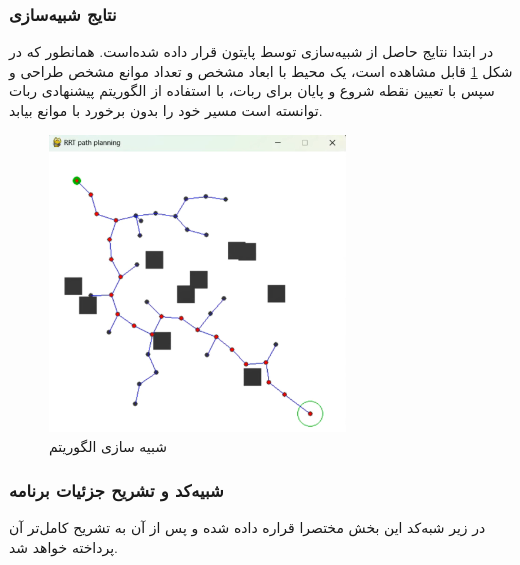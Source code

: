 \subsubsection{نتایج شبیه‌سازی}
در ابتدا نتایج حاصل از شبیه‌سازی توسط پایتون قرار داده‌ شده‌است. همانطور که در شکل
\ref{نتیجه شبیه‌سازی RRT}
قابل مشاهده است، یک محیط با ابعاد مشخص و تعداد موانع مشخص طراحی و سپس با تعیین نقطه شروع و پایان برای ربات، با استفاده از الگوریتم پیشنهادی ربات توانسته است مسیر خود را بدون برخورد با موانع بیابد.
\begin{figure}[H]
	\centering
	\includegraphics[width=0.7\textwidth]{./images/Chapter2/ConvexResult}	
	\caption[شبیه سازی الگوریتم ]{شبیه سازی الگوریتم }
	\label{نتیجه شبیه‌سازی RRT}
\end{figure}
\noindent
\unskip

\subsubsection{شبیه‌کد و تشریح جزئیات برنامه}
در زیر شبه‌کد این بخش مختصرا قراره داده شده و پس از آن به تشریح کامل‌تر آن پرداخته خواهد شد.
\section*{}
\begin{latin}
	
\end{latin}

